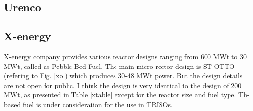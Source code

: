 \documentclass[10pt,a4paper]{article}
\begin{document}
\subsection{Urenco}

\subsection{X-energy}
X-energy company provides various reactor designs ranging from 600 MWt to 30 MWt, called as Pebble Bed Fuel. The main micro-rector design is ST-OTTO (refering to Fig.  \ref{xo}) which produces 30-48 MWt power. But the design details are not open for public. I think the design is very identical to the design of 200 MWt, as presented in Table \ref{xtable} except for the reactor size and fuel type. Th-based fuel is under consideration for the use in TRISOs. 
\end{document}
